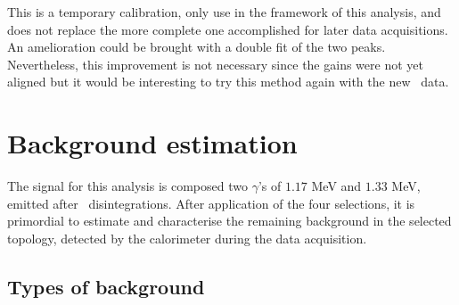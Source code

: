 This is a temporary calibration, only use in the framework of this analysis, and does not replace the more complete one accomplished for later data acquisitions.
An amelioration could be brought with a double fit of the two peaks.
Nevertheless, this improvement is not necessary since the gains were not yet aligned but it would be interesting to try this method again with the new \Co\ data.


\section{Background estimation}
\label{subsec:bkg_estimation}

The signal for this analysis is composed two $\gamma$'s of $1.17$ MeV and $1.33$ MeV, emitted after \Co\ disintegrations.
After application of the four selections, it is primordial to estimate and characterise the remaining background in the selected topology, detected by the calorimeter during the data acquisition.

\subsection{Types of background}

